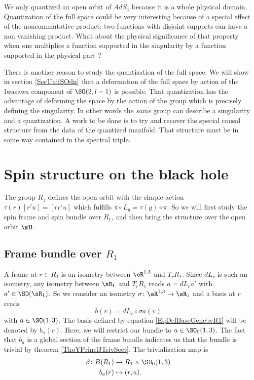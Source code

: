 We only quantized an open orbit of $AdS_4$ because it is a whole physical domain. Quantization of the full space could be very interesting because of a special effect of the noncommutative product: two functions with disjoint supports can have a non vanishing product. What about the physical significance of that property when one multiplies a function supported in the singularity by a function supported in the physical part ?

There is another reason to study the quantization of the full space. We will show in section \ref{SecUnifSOdn} that a deformation of the full space by action of the Iwasawa component of $\SO(2,l-1)$ is possible. That quantization has the advantage of deforming the space by the action of the group which is precisely defining the singularity. In other words the \emph{same} group can describe a singularity and a quantization. A work to be done is to try and recover the special causal structure from the data of the quantized manifold. That structure must be in some way contained in the spectral triple. 


\section{Spin structure on the black hole}

The group $R_1$ defines the open orbit with the simple action $\tau(r)[r'u]=[rr'u]$ which fulfills $\pi\circ L_g=\tau(g)\circ\pi$. So we will first study the spin frame and spin bundle over $R_1$, and then bring the structure over the open orbit $\mU$.

\subsection{Frame bundle over \texorpdfstring{$R_1$}{R1}}

A frame at $r\in R_1$ is an isometry between $\eR^{1,3}$ and $T_rR_1$. Since $dL_r$ is such an isometry, any isometry between $\sR_1$ and $T_rR_1$ reads $a=dL_ra'$ with $a'\in\SO(\sR_1)$. So we consider an isometry $\sigma\colon \eR^{1,3}\to \sR_1$ and a basis at $r$ reads
\begin{equation}   \label{EqDefBaseGenebvR1}
	b(v)=dL_r\circ\sigma a(v)
\end{equation}
with $a\in \SO(1,3)$. The basis defined by equation \eqref{EqDefBaseGenebvR1} will be denoted by $b_a(r)$. Here, we will restrict our bundle to $a\in \SO_0(1,3)$. The fact that $b_a$ is a global section of the frame bundle indicates us that the bundle is trivial by theorem \ref{ThoYPrincBTrivSect}. The trivialization map is 
\begin{equation}
\begin{aligned}
 \beta\colon B(R_1)&\to R_1\times \SO_0(1,3) \\ 
b_a(r)&\mapsto (r,a). 
\end{aligned}
\end{equation}


